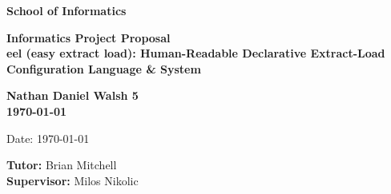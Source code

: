 \documentclass[a4paper,11pt]{article}
\newcommand{\examnumber}{Nathan Daniel Walsh 5}
\newcommand{\field}{eel (easy extract load): Human-Readable Declarative Extract-Load Configuration Language \& System}
\newcommand{\tutor}{Brian Mitchell}
\newcommand{\supervisor}{Milos Nikolic}
\begin{document}
\thispagestyle{empty}
\begin{minipage}[b]{110mm}
    {\Huge\bf School of Informatics
        \vspace*{17mm}}
\end{minipage}
\hfill
\begin{minipage}[t]{40mm}
\end{minipage}
\par\noindent
\vspace*{2cm}
\begin{center}
    \Large\bf Informatics Project Proposal \\
    \Large\bf \field
\end{center}
\vspace*{1.5cm}
\begin{center}
    \bf \examnumber\\
    \monthyeardate\today
\end{center}
\vspace*{5mm}

%
%                       
\begin{abstract}
    
\end{abstract}

\vspace*{1cm}

\vspace*{3cm}
Date: \today

\vfill
{\bf Tutor:} \tutor\\
{\bf Supervisor:} \supervisor
\newpage

\setcounter{page}{1}                            %
\footruleheight{1pt}
\headruleheight{1pt}
\rhead{- \thepage}
\cfoot{}
%

\listoffigures
\listoftables
\pagebreak

\tableofcontents
\pagebreak


\pagebreak

{\small
}
\end{document}

